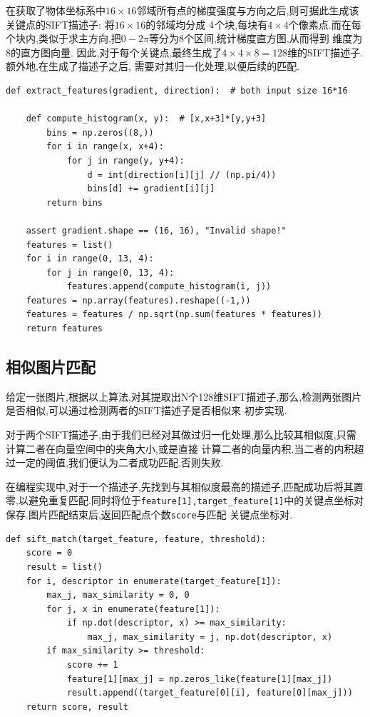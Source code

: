 \documentclass[a4paper]{article}
\begin{document}
在获取了物体坐标系中$16\times16$邻域所有点的梯度强度与方向之后,则可据此生成该关键点的SIFT描述子: 将$16\times16$的邻域均分成
$4\time4$个块,每块有$4\times4$个像素点.而在每个块内,类似于求主方向,把$0-2\pi$等分为8个区间,统计梯度直方图,从而得到
维度为8的直方图向量. 因此,对于每个关键点,最终生成了$4\times4\times8 = 128$维的SIFT描述子.额外地,在生成了描述子之后,
需要对其归一化处理,以便后续的匹配.
\begin{verbatim}
def extract_features(gradient, direction):  # both input size 16*16

    def compute_histogram(x, y):  # [x,x+3]*[y,y+3]
        bins = np.zeros((8,))
        for i in range(x, x+4):
            for j in range(y, y+4):
                d = int(direction[i][j] // (np.pi/4))
                bins[d] += gradient[i][j]
        return bins

    assert gradient.shape == (16, 16), "Invalid shape!"
    features = list()
    for i in range(0, 13, 4):
        for j in range(0, 13, 4):
            features.append(compute_histogram(i, j))
    features = np.array(features).reshape((-1,))
    features = features / np.sqrt(np.sum(features * features))
    return features
\end{verbatim}

        \subsection{相似图片匹配}
给定一张图片,根据以上算法,对其提取出N个128维SIFT描述子,那么,检测两张图片是否相似,可以通过检测两者的SIFT描述子是否相似来
初步实现.

对于两个SIFT描述子,由于我们已经对其做过归一化处理,那么比较其相似度,只需计算二者在向量空间中的夹角大小,或是直接
计算二者的向量内积.当二者的内积超过一定的阈值,我们便认为二者成功匹配,否则失败.

在编程实现中,对于一个描述子,先找到与其相似度最高的描述子,匹配成功后将其置零,以避免重复匹配.同时将位于\texttt
{feature[1],target_feature[1]}中的关键点坐标对保存.图片匹配结束后,返回匹配点个数\texttt{score}与匹配
关键点坐标对.

\begin{verbatim}
def sift_match(target_feature, feature, threshold):
    score = 0
    result = list()
    for i, descriptor in enumerate(target_feature[1]):
        max_j, max_similarity = 0, 0
        for j, x in enumerate(feature[1]):
            if np.dot(descriptor, x) >= max_similarity:
                max_j, max_similarity = j, np.dot(descriptor, x)
        if max_similarity >= threshold:
            score += 1
            feature[1][max_j] = np.zeros_like(feature[1][max_j])
            result.append((target_feature[0][i], feature[0][max_j]))
    return score, result
\end{verbatim}
\end{document}
